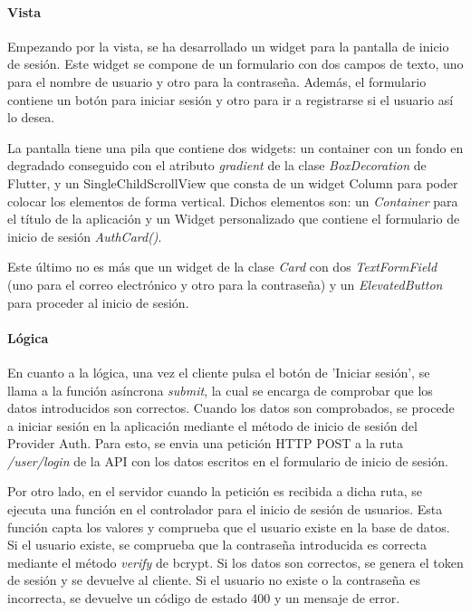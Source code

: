 \paragraph*{Vista}
Empezando por la vista, se ha desarrollado un widget para la pantalla de inicio de sesión. Este widget se compone de un formulario con dos 
campos de texto, uno para el nombre de usuario y otro para la contraseña. Además, el formulario contiene un botón para iniciar sesión y otro 
para ir a registrarse si el usuario así lo desea.

La pantalla tiene una pila que contiene dos widgets: un container con un fondo en degradado conseguido con el atributo \textit{gradient} de la 
clase \textit{BoxDecoration} de Flutter, y un SingleChildScrollView que consta de un widget Column para poder colocar los elementos de forma vertical. 
Dichos elementos son: un \textit{Container} para el título de la aplicación y un Widget personalizado que contiene el formulario de inicio de sesión \textit{AuthCard()}.

Este último no es más que un widget de la clase \textit{Card} con dos \textit{TextFormField} (uno para el correo electrónico y otro para la contraseña) 
y un \textit{ElevatedButton} para proceder al inicio de sesión.

\paragraph*{Lógica}
En cuanto a la lógica, una vez el cliente pulsa el botón de 'Iniciar sesión', se llama a la función asíncrona \textit{submit}, 
la cual se encarga de comprobar que los datos introducidos son correctos.
Cuando los datos son comprobados, se procede a iniciar sesión en la aplicación mediante el método de inicio de sesión del Provider Auth.
 Para esto, se envia una petición HTTP POST a la ruta \textit{/user/login} de la API con los datos escritos en el formulario de inicio de sesión.

Por otro lado, en el servidor cuando la petición es recibida a dicha ruta, se ejecuta una función en el controlador para el inicio de sesión de usuarios.
 Esta función capta los valores y comprueba que el usuario existe en la base de datos. Si el usuario existe, se comprueba que la contraseña introducida es correcta mediante el método \textit{verify} de bcrypt. Si los datos son correctos, se genera el token de sesión y se devuelve al cliente. Si el usuario no existe o la contraseña es incorrecta, se devuelve un código de estado 400 y un mensaje de error.

